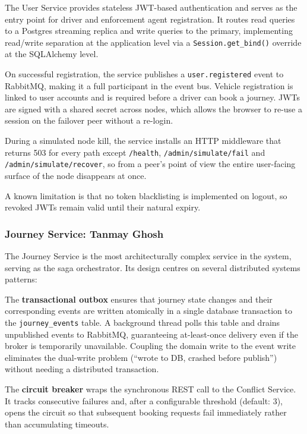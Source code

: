 \documentclass[12pt,a4paper]{article}
\begin{document}
The User Service provides stateless JWT-based authentication and serves as the entry point for driver and enforcement agent registration. It routes read queries to a Postgres streaming replica and write queries to the primary, implementing read/write separation at the application level via a \texttt{Session.get\_bind()} override at the SQLAlchemy level.
 
On successful registration, the service publishes a \texttt{user.registered} event to RabbitMQ, making it a full participant in the event bus. Vehicle registration is linked to user accounts and is required before a driver can book a journey. JWTs are signed with a shared secret across nodes, which allows the browser to re-use a session on the failover peer without a re-login.

During a simulated node kill, the service installs an HTTP middleware that returns 503 for every path except \texttt{/health}, \texttt{/admin/simulate/fail} and \texttt{/admin/simulate/recover}, so from a peer's point of view the entire user-facing surface of the node disappears at once.

A known limitation is that no token blacklisting is implemented on logout, so revoked JWTs remain valid until their natural expiry.
 
\subsubsection{Journey Service: Tanmay Ghosh}
 
The Journey Service is the most architecturally complex service in the system, serving as the saga orchestrator. Its design centres on several distributed systems patterns:
 
The \textbf{transactional outbox} ensures that journey state changes and their corresponding events are written atomically in a single database transaction to the \texttt{journey\_events} table. A background thread polls this table and drains unpublished events to RabbitMQ, guaranteeing at-least-once delivery even if the broker is temporarily unavailable. Coupling the domain write to the event write eliminates the dual-write problem (``wrote to DB, crashed before publish'') without needing a distributed transaction.
 
The \textbf{circuit breaker} wraps the synchronous REST call to the Conflict Service. It tracks consecutive failures and, after a configurable threshold (default: 3), opens the circuit so that subsequent booking requests fail immediately rather than accumulating timeouts.
 
\end{document}
